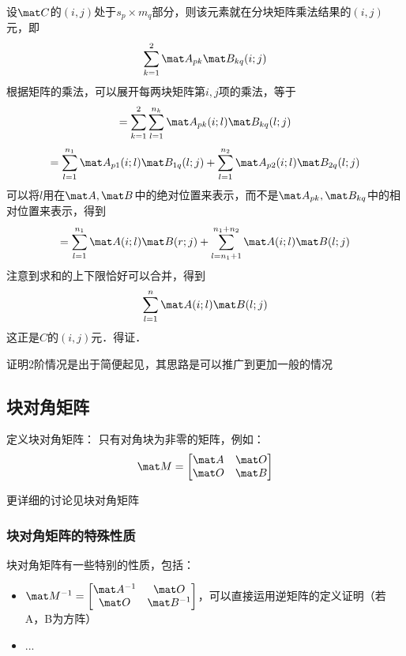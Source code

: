 设$\mat C$的$(i,j)$处于$s_p\times{m_q}$部分，则该元素就在分块矩阵乘法结果的$(i,j)$元，即
\[\sum_{k=1}^{2}\mat A_{pk}\mat B_{kq}(i;j)\]
根据矩阵的乘法，可以展开每两块矩阵第$i,j$项的乘法，等于
\[=\sum_{k=1}^{2}\sum_{l=1}^{n_k}\mat A_{pk}(i;l)\mat B_{kq}(l;j)\]
\[=\sum_{l=1}^{n_1}\mat A_{p1}(i;l)\mat B_{1q}(l;j)+\sum_{l=1}^{n_2}\mat A_{p2}(i;l)\mat B_{2q}(l;j)\]
可以将$l$用在$\mat A,\mat B$中的绝对位置来表示，而不是$\mat A_{pk},\mat B_{kq}$中的相对位置来表示，得到
\[=\sum_{l=1}^{n_1}\mat A(i;l)\mat B(r;j)+\sum_{l=n_1+1}^{n_1+n_2}\mat A(i;l)\mat B(l;j)\]
注意到求和的上下限恰好可以合并，得到
\[\sum_{l=1}^{n}\mat A(i;l)\mat B(l;j)\]
这正是$C$的$(i,j)$元．得证．

证明2阶情况是出于简便起见，其思路是可以推广到更加一般的情况

\subsection{块对角矩阵}
定义块对角矩阵： 只有对角块为非零的矩阵，例如：
\begin{equation}
\mat M = 
\begin{bmatrix}
\mat A & \mat O\\
\mat O & \mat B\\
\end{bmatrix}
\end{equation}

更详细的讨论见块对角矩阵


\subsubsection{块对角矩阵的特殊性质}
块对角矩阵有一些特别的性质，包括：
\begin{itemize}
\item $\mat M ^ {-1} = 
\begin{bmatrix}
\mat A^{-1} & \mat O\\
\mat O & \mat B^{-1}\\
\end{bmatrix}
$，可以直接运用逆矩阵的定义证明（若A，B为方阵）
\item ...
\end{itemize}

